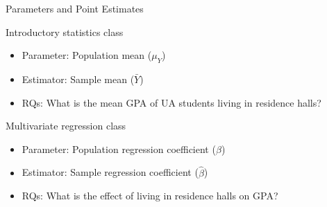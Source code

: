 \documentclass[
  8pt,
  ignorenonframetext,
  dvipsnames]{beamer}
\providecommand{\tightlist}{%
  \setlength{\itemsep}{0pt}\setlength{\parskip}{0pt}}
\let\olditem\item
\renewcommand{\item}{%
  \olditem\vspace{4pt}
}
\begin{document}
\begin{frame}{Parameters and Point Estimates}
\protect\hypertarget{parameters-and-point-estimates}{}

Introductory statistics class

\begin{itemize}
\tightlist
\item
  Parameter: Population mean (\(\mu_Y\))
\item
  Estimator: Sample mean (\(\bar{Y}\))
\item
  RQs: What is the mean GPA of UA students living in residence halls?
\end{itemize}

\medskip

Multivariate regression class

\begin{itemize}
\tightlist
\item
  Parameter: Population regression coefficient (\(\beta\))
\item
  Estimator: Sample regression coefficient (\(\hat{\beta}\))
\item
  RQs: What is the effect of living in residence halls on GPA?
\end{itemize}

\end{frame}
\end{document}
